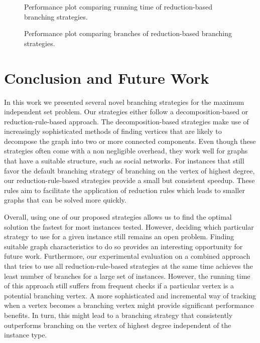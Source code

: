 \documentclass[a4paper,UKenglish,cleveref, autoref, thm-restate]{lipics-v2021}
\begin{document}
\begin{figure}[t]
	\centering
	
	\caption{Performance plot comparing running time of reduction-based branching strategies.}\label{fig:all_reduction_time}
\end{figure}

\begin{figure}[tb!]
	\centering
	
	\caption{Performance plot comparing branches of reduction-based branching strategies.}\label{fig:all_reduction_branch}
\end{figure}


\section{Conclusion and Future Work}
In this work we presented several novel branching strategies for the maximum independent set problem.
Our strategies either follow a decomposition-based or reduction-rule-based approach.
The decomposition-based strategies make use of increasingly sophisticated methods of finding vertices that are likely to decompose the graph into two or more connected components.
Even though these strategies often come with a non negligible overhead, they work well for graphs that have a suitable structure, such as social networks.
For instances that still favor the default branching strategy of branching on the vertex of highest degree, our reduction-rule-based strategies provide a small but consistent speedup.
These rules aim to facilitate the application of reduction rules which leads to smaller graphs that can be solved more quickly.

Overall, using one of our proposed strategies allows us to find the optimal solution the fastest for most instances tested.
However, deciding which particular strategy to use for a given instance still remains an open problem.
Finding suitable graph characteristics to do so provides an interesting opportunity for future work.
Furthermore, our experimental evaluation on a combined approach that tries to use all reduction-rule-based strategies at the same time achieves the least number of branches for a large set of instances.
However, the running time of this approach still suffers from frequent checks if a particular vertex is a potential branching vertex.
A more sophisticated and incremental way of tracking when a vertex becomes a branching vertex might provide significant performance benefits.
In turn, this might lead to a branching strategy that consistently outperforms branching on the vertex of highest degree independent of the instance type.
\end{document}
